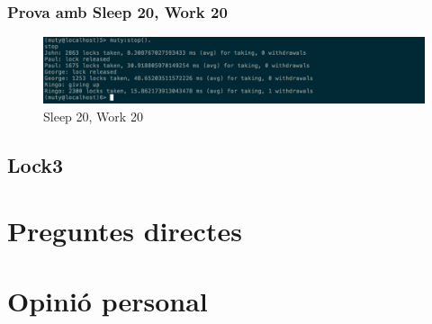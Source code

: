 \documentclass[a4paper, 11pt]{article}
\begin{document}
\subsubsection{Prova amb Sleep 20, Work 20}

\begin{figure}[H]
    \centering
    \includegraphics[width=1.0\textwidth]{figures/20-20lock2}
    \caption{Sleep 20, Work 20 \label{fig:20-20lock2}}    
\end{figure}

\subsection{Lock3}

\section{Preguntes directes}


\section{Opinió personal}
\end{document}
